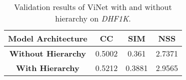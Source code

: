 \documentclass[letterpaper, 10 pt, conference]{ieeeconf}  \usepackage{times}
\begin{document}
\begin{table}[]
    \caption{Validation results of ViNet with and without hierarchy on \emph{DHF1K}.}
    \begin{center}
        
\begin{tabular}{|c|ccc|}
\hline
       \textbf{Model Architecture} & CC  & SIM & NSS \\
\hline\hline
    \textbf{Without Hierarchy}           &0.5002	&0.361	&2.7371 \\
    \textbf{With Hierarchy}           &0.5212	&0.3881	&2.9565 \\
\hline
    \end{tabular}
    \end{center}
    
    \label{tab:hierarchy}
\end{table}
\end{document}
